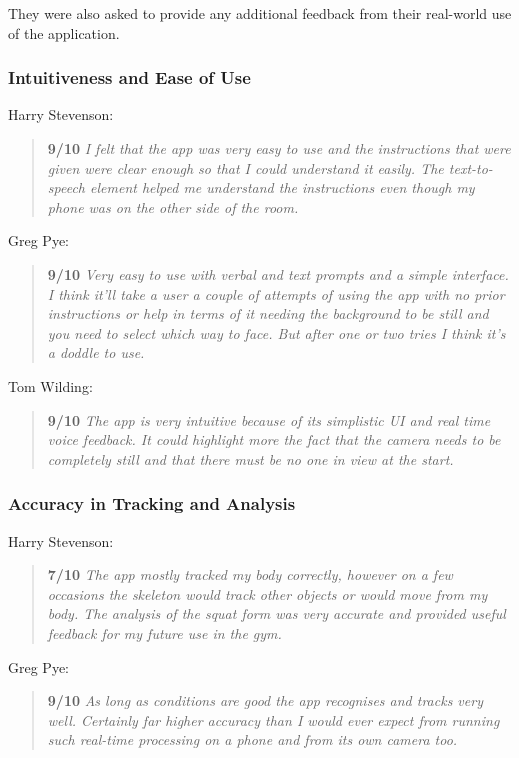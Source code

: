 They were also asked to provide any additional feedback from their real-world use of the application.

\subsubsection{Intuitiveness and Ease of Use}

Harry Stevenson:
\begin{quote}
\textbf{9/10} \emph{I felt that the app was very easy to use and the instructions that were given were clear enough so that I could understand it easily. The text-to-speech element helped me understand the instructions even though my phone was on the other side of the room.}
\end{quote}

Greg Pye:
\begin{quote}
\textbf{9/10} \emph{Very easy to use with verbal and text prompts and a simple interface. I think it'll take a user a couple of attempts of using the app with no prior instructions or help in terms of it needing the background to be still and you need to select which way to face. But after one or two tries I think it's a doddle to use.}
\end{quote}

Tom Wilding:
\begin{quote}
\textbf{9/10} \emph{The app is very intuitive because of its simplistic UI and real time voice feedback. It could highlight more the fact that the camera needs to be completely still and that there must be no one in view at the start.}
\end{quote}

\subsubsection{Accuracy in Tracking and Analysis}

Harry Stevenson:
\begin{quote}
\textbf{7/10} \emph{The app mostly tracked my body correctly, however on a few occasions the skeleton would track other objects or would move from my body. The analysis of the squat form was very accurate and provided useful feedback for my future use in the gym.}
\end{quote}

Greg Pye:
\begin{quote}
\textbf{9/10} \emph{As long as conditions are good the app recognises and tracks very well. Certainly far higher accuracy than I would ever expect from running such real-time processing on a phone and from its own camera too.}
\end{quote}

